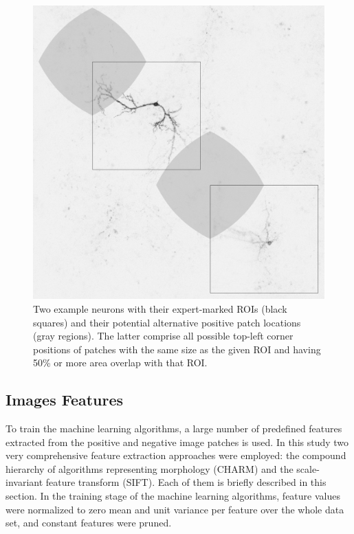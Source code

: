 \begin{figure}%
	\begin{minipage}{0.3\textwidth}
		\includegraphics[width=\textwidth]{fig02}
	\end{minipage}
	\hspace{0.02\textwidth}
	\begin{minipage}{0.65\textwidth}
		\caption{Two example neurons with their expert-marked ROIs (black squares) and their potential alternative positive patch locations (gray regions). The latter comprise all possible top-left corner positions of patches with the same size as the given ROI and having 50\% or more area overlap with that ROI.}
		\label{fig:neuronROI}
	\end{minipage}
\end{figure}
\subsection{Images Features}
\label{subsec:imageFeaturesExtraction}
To train the machine learning algorithms, a large number of predefined features extracted from the positive and negative image patches is used. In this study two very comprehensive feature extraction approaches were employed: the compound hierarchy of algorithms representing morphology (CHARM) and the scale-invariant feature transform (SIFT). Each of them is briefly described in this section. In the training stage of the machine learning algorithms, feature values were normalized to zero mean and unit variance per feature over the whole data set, and constant features were pruned.

